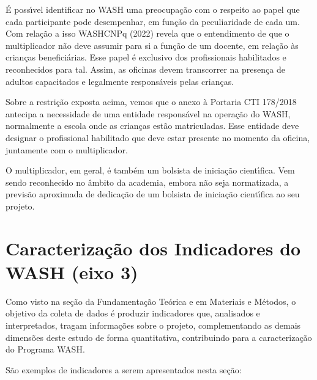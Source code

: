 \documentclass[
12pt,		%
openright,	%
twoside,  %
a4paper,			%
chapter=TITLE,		%
english,			%
french,				%
spanish,			%
brazil				%
]{USPSC-classe/USPSC}
\begin{document}
\'E poss\'{\i}vel identificar no WASH uma preocupa\c{c}\~ao com o respeito ao papel que cada participante pode desempenhar, em fun\c{c}\~ao da peculiaridade de cada um. Com rela\c{c}\~ao a isso WASHCNPq (2022) revela que o entendimento de que o multiplicador n\~ao deve assumir para si a fun\c{c}\~ao de um docente, em rela\c{c}\~ao \`as crian\c{c}as benefici\'arias. Esse papel \'e exclusivo dos profissionais habilitados e reconhecidos para tal. Assim,  as oficinas devem transcorrer na presen\c{c}a de adultos capacitados e legalmente respons\'aveis pelas crian\c{c}as.




Sobre a restri\c{c}\~ao exposta acima, vemos que o anexo \`a Portaria CTI 178/2018 antecipa a necessidade de uma entidade respons\'avel na opera\c{c}\~ao do WASH, normalmente a escola onde as crian\c{c}as est\~ao matriculadas. Esse entidade deve designar o profissional habilitado que deve estar presente no momento da oficina, juntamente com o multiplicador.




O multiplicador, em geral, \'e tamb\'em um bolsista de inicia\c{c}\~ao cient\'{\i}fica. Vem sendo reconhecido no \^ambito da academia, embora n\~ao seja normatizada, a previs\~ao aproximada de dedica\c{c}\~ao de um bolsista de inicia\c{c}\~ao cient\'{\i}fica ao seu projeto.




\section[Caracteriza\c{c}\~ao dos Indicadores do WASH (eixo 3)]{Caracteriza\c{c}\~ao dos Indicadores do WASH (eixo 3)}\label{Caracteriza\c{c}\~ao dos Indicadores do WASH (eixo 3)}
Como visto na se\c{c}\~ao da Fundamenta\c{c}\~ao Te\'orica e em Materiais e M\'etodos, o objetivo da coleta de dados \'e produzir indicadores que, analisados e interpretados, tragam informa\c{c}\~oes sobre o projeto, complementando as demais dimens\~oes deste estudo de forma quantitativa, contribuindo para a caracteriza\c{c}\~ao do Programa WASH.




S\~ao exemplos de indicadores a serem apresentados nesta se\c{c}\~ao:
\end{document}
